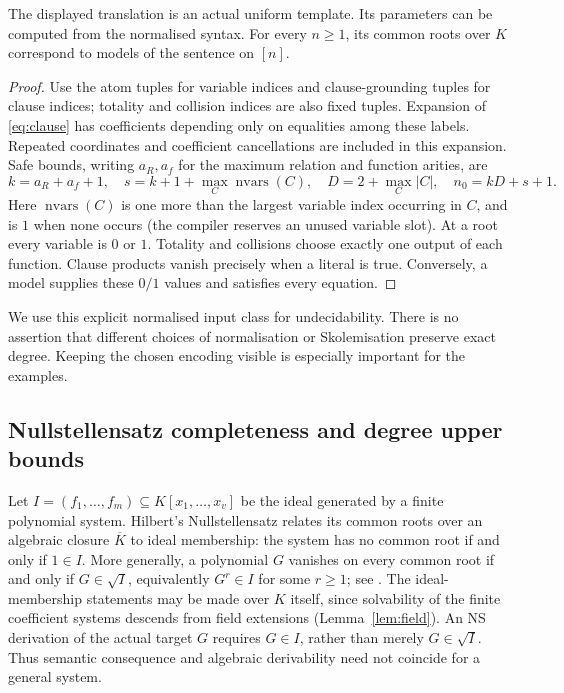 \begin{proposition}\label{prop:compiler}
The displayed translation is an actual uniform template. Its parameters can be computed from the normalised syntax. For every $n\ge1$, its common roots over $K$ correspond to models of the sentence on $[n]$.
\end{proposition}
\begin{proof}
Use the atom tuples for variable indices and clause-grounding tuples for clause indices; totality and collision indices are also fixed tuples. Expansion of \eqref{eq:clause} has coefficients depending only on equalities among these labels. Repeated coordinates and coefficient cancellations are included in this expansion. Safe bounds, writing $a_R,a_f$ for the maximum relation and function arities, are
\[
 k=a_R+a_f+1,\quad s=k+1+\max_C\operatorname{nvars}(C),\quad
 D=2+\max_C|C|,\quad n_0=kD+s+1.
\]
Here $\operatorname{nvars}(C)$ is one more than the largest variable index
occurring in $C$, and is $1$ when none occurs (the compiler reserves an unused variable slot). At a root every variable is $0$ or $1$. Totality and collisions choose exactly one output of each function. Clause products vanish precisely when a literal is true. Conversely, a model supplies these $0/1$ values and satisfies every equation.
\end{proof}

We use this explicit normalised input class for undecidability. There is no assertion that different choices of normalisation or Skolemisation preserve exact degree. Keeping the chosen encoding visible is especially important for the examples.

\subsection{Nullstellensatz completeness and degree upper bounds}\label{sec:booleanrole}
Let $I=(f_1,\ldots,f_m)\subseteq K[x_1,\ldots,x_v]$ be the ideal
generated by a finite polynomial system. Hilbert's Nullstellensatz
relates its common roots over an algebraic closure $\overline K$ to
ideal membership: the system has no common root if and only if
$1\in I$. More generally, a polynomial $G$ vanishes on every common
root if and only if $G\in\sqrt I$, equivalently $G^r\in I$ for some
$r\ge1$; see \cite{LangAlgebra}. The ideal-membership statements may be
made over $K$ itself, since solvability of the finite coefficient
systems descends from field extensions (Lemma~\ref{lem:field}).
An NS derivation of the actual target $G$ requires $G\in I$, rather
than merely $G\in\sqrt I$. Thus semantic consequence and algebraic
derivability need not coincide for a general system.


